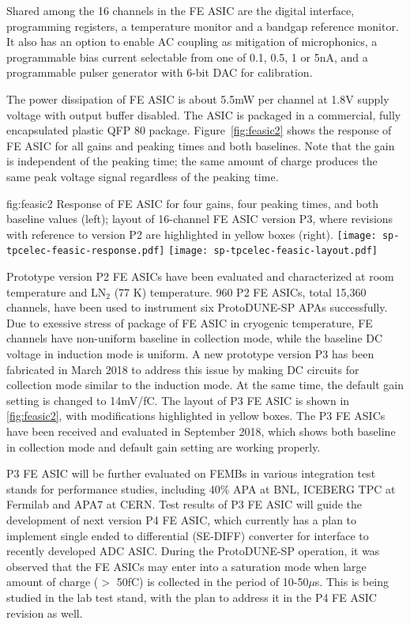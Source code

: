 Shared among the 16 channels in the FE ASIC are the digital interface, programming registers, a temperature monitor and a bandgap reference monitor. It also has an option to enable AC coupling as mitigation of microphonics, a programmable bias current selectable from one of 0.1, 0.5, 1 or 5nA, and a programmable pulser generator with 6-bit DAC for calibration. 

The power dissipation of FE ASIC is about 5.5mW per channel at 1.8V supply voltage with output buffer disabled. The ASIC is packaged in a commercial, fully encapsulated plastic QFP 80 package. Figure~\ref{fig:feasic2} shows the response of FE ASIC for all gains and peaking times and both baselines. Note that the gain is independent of the peaking time; the same amount of charge produces the same peak voltage signal regardless of the peaking time.

\begin{dunefigure}
{fig:feasic2}
{Response of FE ASIC for four gains, four peaking times, and both baseline values (left); layout of 16-channel FE ASIC version P3, where revisions with reference to version P2 are highlighted in yellow boxes (right).}
\texttt{[image: sp-tpcelec-feasic-response.pdf]}
\texttt{[image: sp-tpcelec-feasic-layout.pdf]}
\end{dunefigure}

Prototype version P2 FE ASICs have been evaluated and characterized at room temperature and LN$_2$ (77 K) temperature. 960 P2 FE ASICs, total 15,360 channels, have been used to instrument six ProtoDUNE-SP APAs successfully. Due to exessive stress of package of FE ASIC in cryogenic temperature, FE channels have non-uniform baseline in collection mode, while the baseline DC voltage in induction mode is uniform. A new prototype version P3 has been fabricated in March 2018 to address this issue by making DC circuits for collection mode similar to the induction mode. At the same time, the default gain setting is changed to 14mV/fC. The layout of P3 FE ASIC is shown in \ref{fig:feasic2}, with modifications highlighted in yellow boxes. The P3 FE ASICs have been received and evaluated in September 2018, which shows both baseline in collection mode and default gain setting are working properly.

P3 FE ASIC will be further evaluated on FEMBs in various integration test stands for performance studies, including 40\% APA at BNL, ICEBERG TPC at Fermilab and APA7 at CERN. Test results of P3 FE ASIC will guide the development of next version P4 FE ASIC, which currently has a plan to implement single ended to differential (SE-DIFF) converter for interface to recently developed ADC ASIC. During the ProtoDUNE-SP operation, it was observed that the FE ASICs may enter into a saturation mode when large amount of charge ($>$ 50fC) is collected in the period of 10-50$\mu$s. This is being studied in the lab test stand, with the plan to address it in the P4 FE ASIC revision as well.

